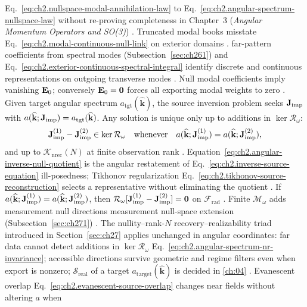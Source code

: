 Eq.~\eqref{eq:ch2.nullspace-modal-annihilation-law} to
Eq.~\eqref{eq:ch2.angular-spectrum-nullspace-law} without re-proving completeness in
Chapter~3 (\emph{Angular Momentum Operators and SO(3)}) \cite{stratton1941}. Truncated modal books misstate
Eq.~\eqref{eq:ch2.modal-continuous-null-link} on exterior domains
\cite{jackson1999}.
far-pattern coefficients from spectral modes (Subsection~\ref{sec:ch261}) and
Eq.~\eqref{eq:ch2.exterior-continuous-spectral-integral} identify discrete and continuous
representations on outgoing transverse modes \cite{stratton1941}. Null modal coefficients imply
vanishing \(\mathbf{E}_0\); conversely \(\mathbf{E}_0=\mathbf{0}\) forces all exporting modal weights to zero
\cite{harrington2001}.
\label{prop:ch2.angular-spectrum-inverse-obstruction}
Given target angular spectrum \(a_{\mathrm{tgt}}(\widehat{\mathbf{k}})\), the source inversion
problem seeks \(\mathbf{J}_{\mathrm{imp}}\) with \(a(\widehat{\mathbf{k}};\mathbf{J}_{\mathrm{imp}})=a_{\mathrm{tgt}}(\widehat{\mathbf{k}})\).
Any solution is unique only up to additions in \(\ker\mathcal{R}_\omega\):
\begin{equation}
\label{eq:ch2.angular-inverse-null-quotient}
\mathbf{J}_{\mathrm{imp}}^{(1)}-\mathbf{J}_{\mathrm{imp}}^{(2)}\in\ker\mathcal{R}_\omega
\quad\text{whenever}\quad
a(\widehat{\mathbf{k}};\mathbf{J}_{\mathrm{imp}}^{(1)})=a(\widehat{\mathbf{k}};\mathbf{J}_{\mathrm{imp}}^{(2)}),
\end{equation}
and up to \(\mathcal{K}_{\mathrm{nrec}}(N)\) at finite observation rank
\cite{stratton1941}. Equation~\eqref{eq:ch2.angular-inverse-null-quotient} is the
angular restatement of Eq.~\eqref{eq:ch2.inverse-source-equation} ill-posedness; Tikhonov
regularization Eq.~\eqref{eq:ch2.tikhonov-source-reconstruction} selects a representative without
eliminating the quotient \cite{stratton1941}.
If \(a(\widehat{\mathbf{k}};\mathbf{J}_{\mathrm{imp}}^{(1)})=a(\widehat{\mathbf{k}};\mathbf{J}_{\mathrm{imp}}^{(2)})\), then
\(\mathcal{R}_\omega[\mathbf{J}_{\mathrm{imp}}^{(1)}-\mathbf{J}_{\mathrm{imp}}^{(2)}]=\mathbf{0}\) on \(\mathcal{F}_{\mathrm{rad}}\)
\cite{stratton1941}. Finite \(\mathcal{M}_\omega\) adds measurement null directions
measurement null-space extension (Subsection~\ref{sec:ch271}) \cite{harrington2001}. The nullity--rank-$N$ recovery--realizability triad introduced in Section~\ref{sec:ch27} applies
unchanged in angular coordinates: far data cannot detect additions in \(\ker\mathcal{R}_\omega\)
Eq.~\eqref{eq:ch2.angular-spectrum-nr-invariance}; accessible directions survive geometric and
regime filters even when export is nonzero; $\mathcal{S}_{\mathrm{real}}$ of a target
\(a_{\mathrm{target}}(\widehat{\mathbf{k}})\) is decided in \ref{ch:04} \cite{devaney2004}. Evanescent overlap
Eq.~\eqref{eq:ch2.evanescent-source-overlap} changes near fields without altering \(a\) when
